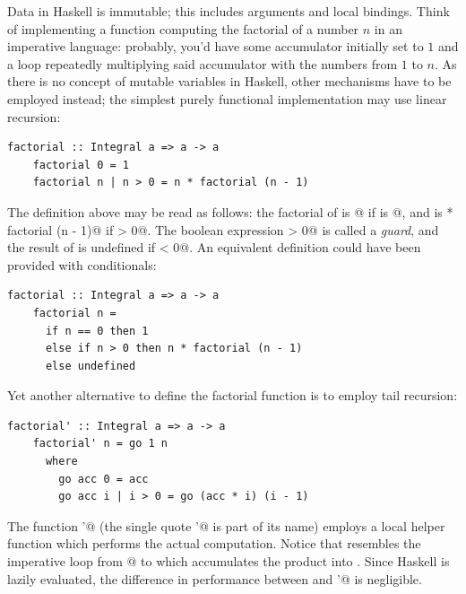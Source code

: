 \documentclass[UdineBachThesis,american,11pt,draft]{PhdThesis}
\begin{document}
  Data in Haskell is immutable; this includes arguments and local bindings.
  Think of implementing a function computing the factorial of a number $n$ in an
  imperative language: probably, you'd have some accumulator initially set to
  $1$ and a loop repeatedly multiplying said accumulator with the numbers from
  $1$ to $n$. As there is no concept of mutable variables in Haskell, other
  mechanisms have to be employed instead; the simplest purely functional
  implementation may use linear recursion:

  \begin{lstlisting}[gobble=4,basicstyle=\ttfamily\small]
    factorial :: Integral a => a -> a
    factorial 0 = 1
    factorial n | n > 0 = n * factorial (n - 1)
  \end{lstlisting}

  The definition above may be read as follows: the factorial of \lstinline@n@ is
  @ if \lstinline@n@ is @, and is
  \lstinline@n * factorial (n - 1)@ if \lstinline@n > 0@. The boolean expression
  \lstinline@n > 0@ is called a \emph{guard}, and the result of
  \lstinline@factorial@ is undefined if \lstinline@n < 0@. An equivalent
  definition could have been provided with conditionals:

  \begin{lstlisting}[gobble=4,basicstyle=\ttfamily\small]
    factorial :: Integral a => a -> a
    factorial n =
      if n == 0 then 1
      else if n > 0 then n * factorial (n - 1)
      else undefined
  \end{lstlisting}

  Yet another alternative to define the factorial function is to employ tail
  recursion:

  \begin{lstlisting}[gobble=4,basicstyle=\ttfamily\small]
    factorial' :: Integral a => a -> a
    factorial' n = go 1 n
      where
        go acc 0 = acc
        go acc i | i > 0 = go (acc * i) (i - 1)
  \end{lstlisting}

  The function \lstinline@factorial'@ (the single quote \lstinline@'@ is part of
  its name) employs a local helper function \lstinline@go@ which performs the
  actual computation. Notice that \lstinline@go@ resembles the imperative loop
  from @ to \lstinline@n@ which accumulates the product into
  \lstinline@acc@. Since Haskell is lazily evaluated, the difference in
  performance between \lstinline@factorial@ and \lstinline@factorial'@ is
  negligible.
\end{document}
